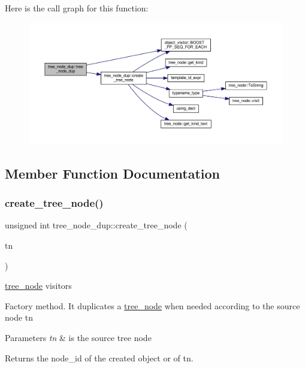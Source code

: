 Here is the call graph for this function\+:
\nopagebreak
\begin{figure}[H]
\begin{center}
\leavevmode
\includegraphics[width=350pt]{d8/dd5/structtree__node__dup_afe9798b8ebac6b2c69c2abd5423bcf5c_cgraph}
\end{center}
\end{figure}


\subsection{Member Function Documentation}
\mbox{\label{structtree__node__dup_abec376e3d87e9de8ef2c9d271b185a0a}} 
\subsubsection{\texorpdfstring{create\+\_\+tree\+\_\+node()}{create\_tree\_node()}}
{\footnotesize\ttfamily unsigned int tree\+\_\+node\+\_\+dup\+::create\+\_\+tree\+\_\+node (\begin{DoxyParamCaption}\item[{const \hyperlink{tree__node_8hpp_a6ee377554d1c4871ad66a337eaa67fd5}{tree\+\_\+node\+Ref} \&}]{tn }\end{DoxyParamCaption})}



\hyperlink{classtree__node}{tree\+\_\+node} visitors 

Factory method. It duplicates a \hyperlink{classtree__node}{tree\+\_\+node} when needed according to the source node tn 
\begin{DoxyParams}{Parameters}
{\em tn} & is the source tree node \\
\hline
\end{DoxyParams}
\begin{DoxyReturn}{Returns}
the node\+\_\+id of the created object or of tn. 
\end{DoxyReturn}


